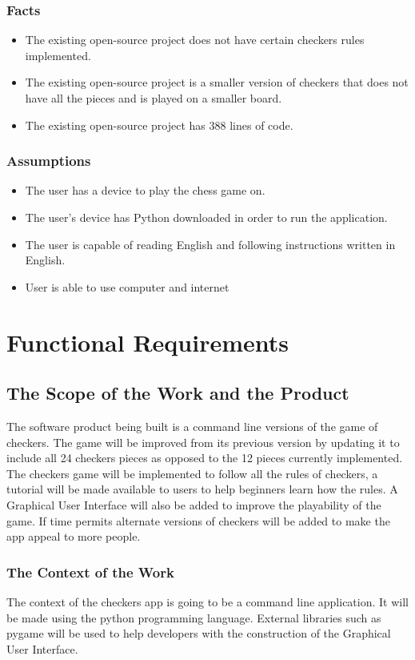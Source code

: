 \documentclass[12pt, titlepage]{article}
\begin{document}
\subsubsection{Facts}
\begin{itemize}
    \item The existing open-source project does not have certain checkers rules implemented.
    \item The existing open-source project is a smaller version of checkers that does not have all the pieces and is played on a smaller board.
    \item The existing open-source project has 388 lines of code.
\end{itemize}
\subsubsection{Assumptions}
\begin{itemize}
    \item The user has a device to play the chess game on.
    \item The user's device has Python downloaded in order to run the application.
    \item The user is capable of reading English and following instructions written in English.
    \item User is able to use computer and internet
\end{itemize}

\section{Functional Requirements}

\subsection{The Scope of the Work and the Product}
The software product being built is a command line versions of the game of checkers. The game will be improved from its previous version by updating it to include all 24 checkers pieces as opposed to the 12 pieces currently implemented. The checkers game will be implemented to follow all the rules of checkers, a tutorial will be made available to users to help beginners learn how the rules. A Graphical User Interface will also be added to improve the playability of the game. If time permits alternate versions of checkers will be added to make the app appeal to more people.
\subsubsection{The Context of the Work}
The context of the checkers app is going to be a command line application. It will be made using the python programming language. External libraries such as pygame will be used to help developers with the construction of the Graphical User Interface.
\end{document}
